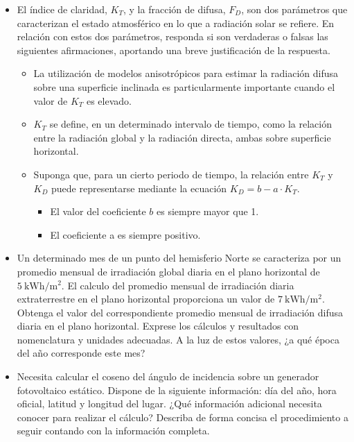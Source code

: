 \documentclass[article, a4paper]{memoir}
\begin{document}
\begin{itemize}
\item El índice de claridad, \(K_{T}\), y la fracción de difusa, \(F_{D}\),
son dos parámetros que caracterizan el estado atmosférico en lo que
a radiación solar se refiere. En relación con estos dos parámetros,
responda si son verdaderas o falsas las siguientes afirmaciones,
aportando una breve justificación de la respuesta.

\begin{itemize}
\item La utilización de modelos anisotrópicos para estimar la radiación
difusa sobre una superficie inclinada es particularmente importante
cuando el valor de \(K_{T}\) es elevado.

\item \(K_{T}\) se define, en un determinado intervalo de tiempo, como la
relación entre la radiación global y la radiación directa, ambas
sobre superficie horizontal.

\item Suponga que, para un cierto periodo de tiempo, la relación entre
\(K_{T}\) y \(K_{D}\) puede representarse mediante la ecuación
\(K_{D}=b-a\cdot K_{T}\).
\begin{itemize}
\item El valor del coeficiente \(b\) es siempre mayor que 1.
\item El coeficiente a es siempre positivo.
\end{itemize}
\end{itemize}

\item Un determinado mes de un punto del hemisferio Norte se caracteriza
por un promedio mensual de irradiación global diaria en el plano
horizontal de \(\SI{5}{\kWh\per\meter\squared}\). El calculo del
promedio mensual de irradiación diaria extraterrestre en el plano
horizontal proporciona un valor de
\(\SI{7}{\kWh\per\meter\squared}\). Obtenga el valor del
correspondiente promedio mensual de irradiación difusa diaria en el
plano horizontal. Exprese los cálculos y resultados con nomenclatura
y unidades adecuadas. A la luz de estos valores, ¿a qué época del
año corresponde este mes?
\end{itemize}

\begin{itemize}
\item Necesita calcular el coseno del ángulo de incidencia sobre un
generador fotovoltaico estático. Dispone de la siguiente
información: día del año, hora oficial, latitud y longitud del
lugar. ¿Qué información adicional necesita conocer para realizar el
cálculo? Describa de forma concisa el procedimiento a seguir
contando con la información completa.
\end{itemize}
\end{document}
